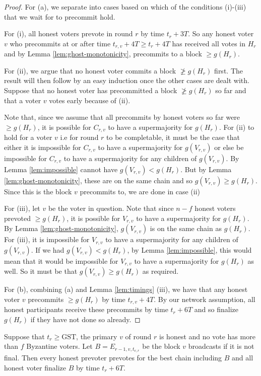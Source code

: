 \documentclass[a4paper,UKenglish,cleveref, autoref, thm-restate, anonymous]{lipics-v2019}
\def\GST{\mathrm{GST}}
\begin{document}
\begin{proof} For (a), we separate into cases based on which of the conditions (i)-(iii) that we wait for to precommit hold.

For (i), all honest voters prevote in round $r$ by time $t_r+3T$. So any honest voter $v$ who precommits at or after time $t_{r,v}+4T \geq t_r+4T$ has received all votes in $H_r$ and by Lemma \ref{lem:ghost-monotonicity}, precommits to a block $\geq g(H_r)$.

For (ii), we argue that no honest voter commits a block $\not\geq g(H_r)$ first. The result will then follow by an easy induction once the other cases are dealt with. Suppose that no honest voter has precommitted a block $\not \geq g(H_r)$ so far and that a voter $v$ votes early because of (ii).

Note that, since we assume that all precommits by honest voters so far were $\geq g(H_r)$, it is possible for $C_{r,v}$ to have a supermajority for $g(H_r)$.
For (ii) to hold for a voter $v$ i.e for round $r$ to be completable, it must be the case that either it is impossible for $C_{r,v}$ to have a supermajority for $g(V_{r,v})$ or else be impossible for $C_{r,v}$ to have a supermajority for any children of $g(V_{r,v})$. By Lemma \ref{lem:impossible} cannot have $g(V_{r,v}) < g(H_r)$.
But by Lemma \ref{lem:ghost-monotonicity}, these are on the same chain and so $g(V_{r,v}) \geq g(H_r)$. Since this is the block $v$ precommits to, we are done in case (ii)

For (iii), let $v$ be the voter in question. Note that since $n-f$ honest voters prevoted $\geq g(H_r)$, it is possible for $V_{r,v}$ to have a supermajority for $g(H_r)$. By Lemma \ref{lem:ghost-monotonicity}, $g(V_{r,v})$ is on the same chain as $g(H_r)$.
For (iii), it is impossible for $V_{r,v}$ to have a supermajority for any children of $g(V_{r,v})$. If we had $g(V_{r,v}) < g(H_r)$, by Lemma \ref{lem:impossible}, this would mean that it would be impossible for $V_{r,v}$ to have a supermajority for $g(H_r)$ as well. So it must be that $g(V_{r,v} )\geq g(H_r)$ as required.

For (b), combining (a) and Lemma \ref{lem:timings} (iii), we have that any honest voter $v$ precommits $\geq g(H_r)$ by time $t_{r,v}+4T$. By our network assumption, all honest participants receive these precommits by time $t_r+6T$ and so finalize $g(H_r)$ if they have not done so already.
\end{proof}

\begin{lemma} \label{lem:primary-finalizes}
 Suppose that $t_r \geq \GST$, the primary $v$ of round $r$ is honest and no vote has more than $f$ Byzantine voters. Let $B=E_{r-1,v,t_{v,r}}$ be the block $v$ broadcasts if it is not final. Then every honest prevoter prevotes for the best chain including $B$ and all honest voter finalize $B$ by time $t_r+6T$.
 \end{lemma}
\end{document}
